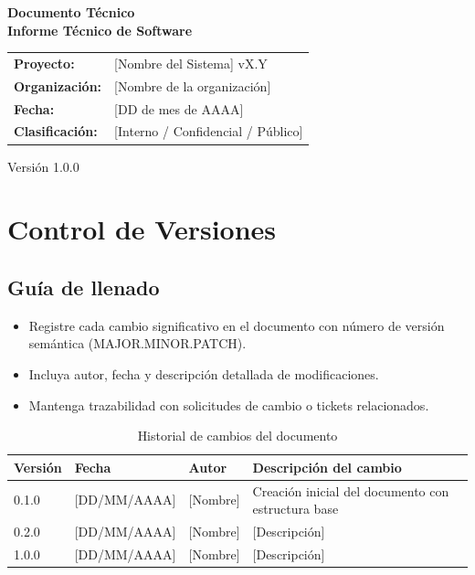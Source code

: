 \documentclass[a4paper,11pt,spanish]{article}
\begin{document}
\thispagestyle{empty}

\begin{center}
    \vspace*{3cm}
    {\LARGE \bfseries Documento Técnico}\\[0.5em]
    {\LARGE \bfseries Informe Técnico de Software}\\[2cm]
    
    \begin{tabular}{ll}
        \textbf{Proyecto:} & [Nombre del Sistema] vX.Y \\
        \textbf{Organización:} & [Nombre de la organización] \\
        \textbf{Fecha:} & [DD de mes de AAAA] \\
        \textbf{Clasificación:} & [Interno / Confidencial / Público] \\
    \end{tabular}
    
    \vfill
    {\small Versión 1.0.0}
\end{center}

\newpage

\tableofcontents

\newpage

\section{Control de Versiones}

\subsection*{Guía de llenado}

\begin{itemize}
    \item Registre cada cambio significativo en el documento con número de versión semántica (MAJOR.MINOR.PATCH).
    \item Incluya autor, fecha y descripción detallada de modificaciones.
    \item Mantenga trazabilidad con solicitudes de cambio o tickets relacionados.
\end{itemize}

\begin{table}[H]
\centering
\caption{Historial de cambios del documento}
\label{tab:historial-cambios}
\begin{tabular}{@{}llll@{}}
\toprule
\textbf{Versión} & \textbf{Fecha} & \textbf{Autor} & \textbf{Descripción del cambio} \\
\midrule
0.1.0 & [DD/MM/AAAA] & [Nombre] & Creación inicial del documento con estructura base \\
0.2.0 & [DD/MM/AAAA] & [Nombre] & [Descripción] \\
1.0.0 & [DD/MM/AAAA] & [Nombre] & [Descripción] \\
\bottomrule
\end{tabular}
\end{table}
\end{document}
